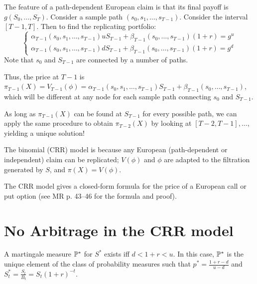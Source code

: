 \begin{remark}
    
    The feature of a path-dependent European claim is that its final payoff is $g(S_0, \dots, S_T)$. Consider a sample path $(s_0, s_1, \dots, s_{T-1})$. Consider the interval $[T-1, T]$. Then to find the replicating portfolio:
    \[ \begin{cases} \alpha_{T-1}(s_0, s_1, \dots, s_{T-1}) u S_{T-1} + \beta_{T-1}(s_0, \dots, s_{T-1})(1+r) = g^u \\ \alpha_{T-1}(s_0, s_1, \dots, s_{T-1}) d S_{T-1} + \beta_{T-1}(s_0, \dots, s_{T-1})(1+r) = g^d \end{cases} \]
    Note that $s_0$ and $S_{T-1}$ are connected by a number of paths.
    
    Thus, the price at $T-1$ is $\pi_{T-1}(X) = V_{T-1}(\phi) = \alpha_{T-1}(s_0, s_1, \dots, s_{T-1}) S_{T-1} + \beta_{T-1}(s_0, \dots, s_{T-1})$, which will be different at any node for each sample path connecting $s_0$ and $S_{T-1}$.
    
    As long as $\pi_{T-1}(X)$ can be found at $S_{T-1}$ for every possible path, we can apply the same procedure to obtain $\pi_{T-2}(X)$ by looking at $[T-2, T-1], \dots$, yielding a unique solution!
\end{remark}

\begin{remark}
    The binomial (CRR) model is  because any European (path-dependent or independent) claim can be replicated; $V(\phi)$ and $\phi$ are adapted to the filtration generated by $S$, and $\pi(X) = V(\phi)$.
    
    The CRR model gives a closed-form formula for the price of a European call or put option (see MR p. 43--46 for the formula and proof).
\end{remark}

\section{No Arbitrage in the CRR model}

\begin{proposition}
    A martingale measure $\mathbb P^*$ for $S^*$ exists iff $d < 1+r < u$. In this case, $\mathbb P^*$ is the unique element of the class of probability measures such that $p^* = \frac{1+r-d}{u-d}$ and $S_t^* = \frac{S_t}{B_t} = S_t(1+r)^{-t}$.
\end{proposition}


